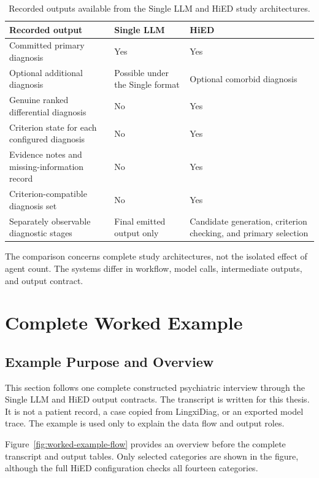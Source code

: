 \begin{table}[htbp]
\centering
\caption{Recorded outputs available from the Single LLM and HiED study architectures.}
\label{tab:single-hied-output-comparison}
\footnotesize
\begin{tabularx}{\textwidth}{|>{\raggedright\arraybackslash}p{4.2cm}|>{\centering\arraybackslash}p{3.0cm}|>{\centering\arraybackslash}X|}
\hline
\textbf{Recorded output} & \textbf{Single LLM} & \textbf{HiED}\\
\hline
Committed primary diagnosis & Yes & Yes\\
\hline
Optional additional diagnosis & Possible under the Single format & Optional comorbid diagnosis\\
\hline
Genuine ranked differential diagnosis & No & Yes\\
\hline
Criterion state for each configured diagnosis & No & Yes\\
\hline
Evidence notes and missing-information record & No & Yes\\
\hline
Criterion-compatible diagnosis set & No & Yes\\
\hline
Separately observable diagnostic stages & Final emitted output only & Candidate generation, criterion checking, and primary selection\\
\hline
\end{tabularx}
\end{table}

The comparison concerns complete study architectures, not the isolated effect of agent count. The systems differ in workflow, model calls, intermediate outputs, and output contract.

\section{Complete Worked Example}
\label{sec:running-example}
\label{sec:worked-example}

\subsection{Example Purpose and Overview}

This section follows one complete constructed psychiatric interview through the Single LLM and HiED output contracts. The transcript is written for this thesis. It is not a patient record, a case copied from LingxiDiag, or an exported model trace. The example is used only to explain the data flow and output roles.

Figure~\ref{fig:worked-example-flow} provides an overview before the complete transcript and output tables. Only selected categories are shown in the figure, although the full HiED configuration checks all fourteen categories.

